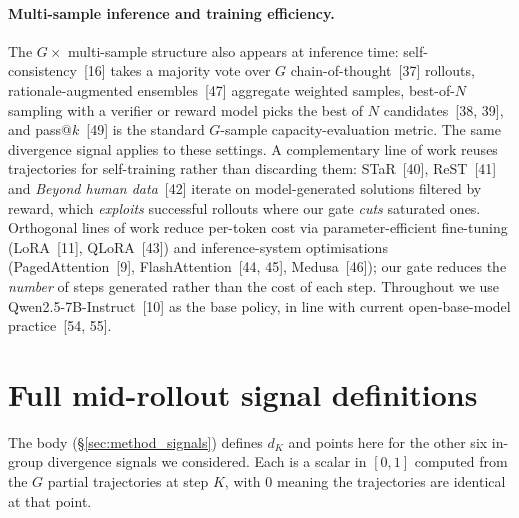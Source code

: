 \documentclass{article}
\begin{document}
\paragraph{Multi-sample inference and training efficiency.}
The $G\times$ multi-sample structure also appears at inference
time: self-consistency~[16] takes a majority vote over $G$
chain-of-thought~[37] rollouts, rationale-augmented
ensembles~[47] aggregate weighted samples, best-of-$N$ sampling
with a verifier or reward model picks the best of $N$
candidates~[38, 39], and pass@$k$~[49] is the standard $G$-sample
capacity-evaluation metric. The same divergence signal applies
to these settings. A complementary line of work reuses
trajectories for self-training rather than discarding them:
STaR~[40], ReST~[41] and \emph{Beyond human data}~[42] iterate
on model-generated solutions filtered by reward, which
\emph{exploits} successful rollouts where our gate \emph{cuts}
saturated ones. Orthogonal lines of work reduce per-token cost
via parameter-efficient fine-tuning (LoRA~[11], QLoRA~[43]) and
inference-system optimisations (PagedAttention~[9],
FlashAttention~[44, 45], Medusa~[46]); our gate reduces the
\emph{number} of steps generated rather than the cost of each
step. Throughout we use Qwen2.5-7B-Instruct~[10] as the base
policy, in line with current open-base-model
practice~[54, 55].

\section{Full mid-rollout signal definitions}
\label{app:signals}

The body (\S\ref{sec:method_signals}) defines $d_K$ and points
here for the other six in-group divergence signals we considered.
Each is a scalar in $[0, 1]$ computed from the $G$ partial
trajectories at step $K$, with $0$ meaning the trajectories are
identical at that point.
\end{document}
